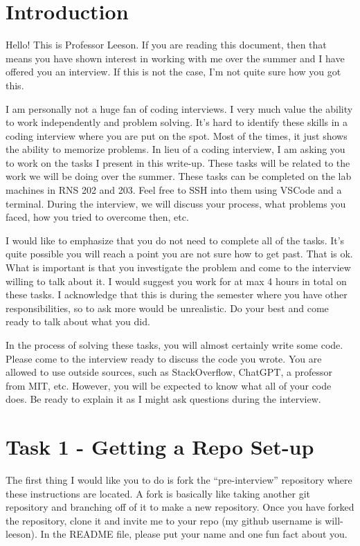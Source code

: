 \documentclass{article}
\begin{document}
\pagestyle{fancy}

\section*{Introduction}
Hello! This is Professor Leeson. 
If you are reading this document, then that means you have shown interest in working with me over the summer and I have offered you an interview.
If this is not the case, I'm not quite sure how you got this.

I am personally not a huge fan of coding interviews. 
I very much value the ability to work independently and problem solving.
It's hard to identify these skills in a coding interview where you are put on the spot.
Most of the times, it just shows the ability to memorize problems.
In lieu of a coding interview, I am asking you to work on the tasks I present in this write-up.
These tasks will be related to the work we will be doing over the summer.
These tasks can be completed on the lab machines in RNS 202 and 203.
Feel free to SSH into them using VSCode and a terminal.
During the interview, we will discuss your process, what problems you faced, how you tried to overcome then, etc.

I would like to emphasize that you do not need to complete all of the tasks.
It's quite possible you will reach a point you are not sure how to get past.
That is ok.
What is important is that you investigate the problem and come to the interview willing to talk about it.
I would suggest you work for at max 4 hours in total on these tasks.
I acknowledge that this is during the semester where you have other responsibilities, so to ask more would be unrealistic.
Do your best and come ready to talk about what you did.

In the process of solving these tasks, you will almost certainly write some code.
Please come to the interview ready to discuss the code you wrote.
You are allowed to use outside sources, such as StackOverflow, ChatGPT, a professor from MIT, etc.
However, you will be expected to know what all of your code does.
Be ready to explain it as I might ask questions during the interview.

\section*{Task 1 - Getting a Repo Set-up}
The first thing I would like you to do is fork the ``pre-interview'' repository where these instructions are located.
A fork is basically like taking another git repository and branching off of it to make a new repository.
Once you have forked the repository, clone it and invite me to your repo (my github username is will-leeson).
In the README file, please put your name and one fun fact about you.
\end{document}

